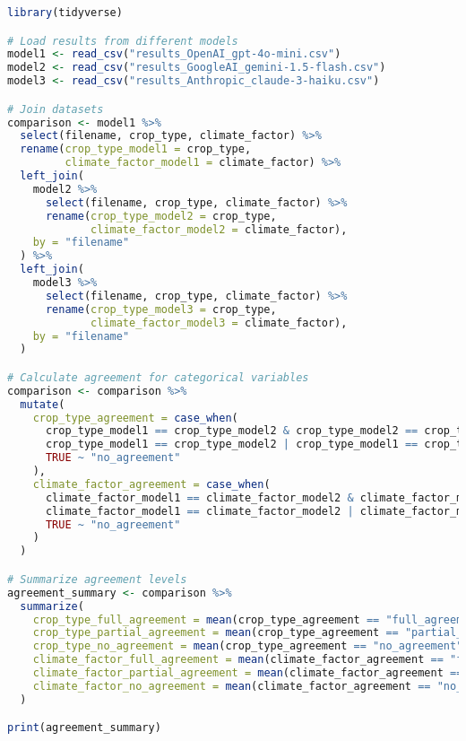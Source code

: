 \begin{commandbox}
\begin{lstlisting}[language=R]
library(tidyverse)

# Load results from different models
model1 <- read_csv("results_OpenAI_gpt-4o-mini.csv")
model2 <- read_csv("results_GoogleAI_gemini-1.5-flash.csv")
model3 <- read_csv("results_Anthropic_claude-3-haiku.csv")

# Join datasets
comparison <- model1 %>%
  select(filename, crop_type, climate_factor) %>%
  rename(crop_type_model1 = crop_type,
         climate_factor_model1 = climate_factor) %>%
  left_join(
    model2 %>%
      select(filename, crop_type, climate_factor) %>%
      rename(crop_type_model2 = crop_type,
             climate_factor_model2 = climate_factor),
    by = "filename"
  ) %>%
  left_join(
    model3 %>%
      select(filename, crop_type, climate_factor) %>%
      rename(crop_type_model3 = crop_type,
             climate_factor_model3 = climate_factor),
    by = "filename"
  )

# Calculate agreement for categorical variables
comparison <- comparison %>%
  mutate(
    crop_type_agreement = case_when(
      crop_type_model1 == crop_type_model2 & crop_type_model2 == crop_type_model3 ~ "full_agreement",
      crop_type_model1 == crop_type_model2 | crop_type_model1 == crop_type_model3 | crop_type_model2 == crop_type_model3 ~ "partial_agreement",
      TRUE ~ "no_agreement"
    ),
    climate_factor_agreement = case_when(
      climate_factor_model1 == climate_factor_model2 & climate_factor_model2 == climate_factor_model3 ~ "full_agreement",
      climate_factor_model1 == climate_factor_model2 | climate_factor_model1 == climate_factor_model3 | climate_factor_model2 == climate_factor_model3 ~ "partial_agreement",
      TRUE ~ "no_agreement"
    )
  )

# Summarize agreement levels
agreement_summary <- comparison %>%
  summarize(
    crop_type_full_agreement = mean(crop_type_agreement == "full_agreement"),
    crop_type_partial_agreement = mean(crop_type_agreement == "partial_agreement"),
    crop_type_no_agreement = mean(crop_type_agreement == "no_agreement"),
    climate_factor_full_agreement = mean(climate_factor_agreement == "full_agreement"),
    climate_factor_partial_agreement = mean(climate_factor_agreement == "partial_agreement"),
    climate_factor_no_agreement = mean(climate_factor_agreement == "no_agreement")
  )

print(agreement_summary)
\end{lstlisting}
\end{commandbox}


